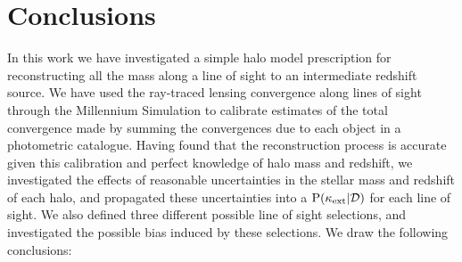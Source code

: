 \documentclass[useAMS,usenatbib,a4paper]{mn2e}
\begin{document}

\section{Conclusions}
\label{sec:conclude}

In this work we have investigated a simple halo model prescription for
reconstructing all the mass along a line of sight to an intermediate redshift
source. We have used the ray-traced lensing convergence along lines of sight
through the Millennium Simulation to calibrate estimates of the total
convergence made by summing the convergences due to each object in a
photometric catalogue. Having found that the reconstruction process is
accurate given this calibration and perfect knowledge of halo mass and
redshift, we investigated the effects of reasonable uncertainties in the
stellar mass and redshift of each halo, and propagated these uncertainties
into a ${\rm P}(\kappa_{\rm ext}|{\mathcal{D}})$ for each line of sight. We also defined three
different possible line of sight selections, and investigated the possible 
bias induced by these selections. We draw the following conclusions:
\end{document}
